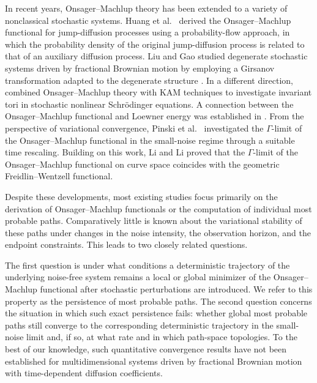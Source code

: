 \documentclass[preprint,12pt]{elsarticle}
\theoremstyle{definition}
\theoremstyle{plain}
\begin{document}
In recent years, Onsager--Machlup theory has been extended to a variety of
nonclassical stochastic systems. Huang et al.~\cite{duanjq} derived the
Onsager--Machlup functional for jump-diffusion processes using a
probability-flow approach, in which the probability density of the original
jump-diffusion process is related to that of an auxiliary diffusion process.
Liu and Gao studied degenerate stochastic systems driven by fractional
Brownian motion by employing a Girsanov transformation adapted to the
degenerate structure \cite{liu2024onsager,Liu2026}. In a different direction,
\cite{zhang2025persistenceinvarianttoristochastic} combined
Onsager--Machlup theory with KAM techniques to investigate invariant tori in
stochastic nonlinear Schr\"odinger equations. A connection between the
Onsager--Machlup functional and Loewner energy was established in
\cite{Carfagnini2024}. From the perspective of variational convergence,
Pinski et al.~\cite{pinski2012gamma} investigated the $\Gamma$-limit of the
Onsager--Machlup functional in the small-noise regime through a suitable time
rescaling. Building on this work, Li and Li
\cite{doi:10.1137/20M1310539} proved that the $\Gamma$-limit of the
Onsager--Machlup functional on curve space coincides with the geometric
Freidlin--Wentzell functional.

Despite these developments, most existing studies focus primarily on
the derivation of Onsager--Machlup functionals or the computation of
individual most probable paths. Comparatively little is known about the
variational stability of these paths under changes in the noise
intensity, the observation horizon, and the endpoint constraints. This
leads to two closely related questions.

The first question is under what conditions a deterministic trajectory
of the underlying noise-free system remains a local or global minimizer
of the Onsager--Machlup functional after stochastic perturbations are
introduced. We refer to this property as the persistence of most
probable paths. The second question concerns the situation in which
such exact persistence fails: whether global most probable paths still
converge to the corresponding deterministic trajectory in the
small-noise limit and, if so, at what rate and in which path-space
topologies. To the best of our knowledge, such quantitative convergence
results have not been established for multidimensional systems driven
by fractional Brownian motion with time-dependent diffusion
coefficients.
\end{document}
